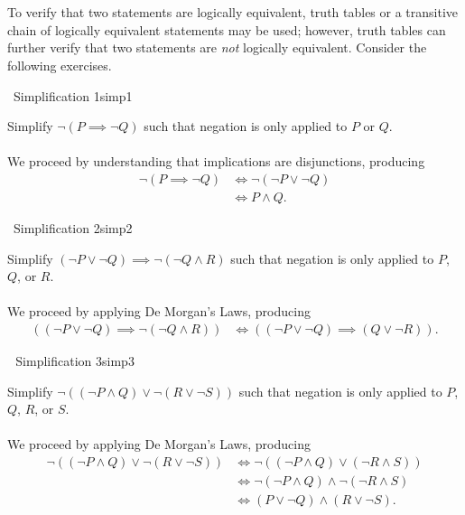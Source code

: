         \vphantom
        \\
        \\
        To verify that two statements are logically equivalent, truth tables or a transitive chain of logically equivalent statements may be used; however, truth tables can further verify that two statements are \textit{not} logically equivalent. Consider the following exercises.
        \begin{exercise}{\Difficulty\,\Difficulty\,\,Simplification 1}{simp1}
        
            Simplify \(\neg(P\implies\neg Q)\) such that negation is only applied to \(P\) or \(Q\).
            \\
            \\
            We proceed by understanding that implications are disjunctions, producing
            \begin{align*}
                \neg(P\implies\neg Q)&\iff\neg(\neg P \vee \neg Q) \\
                &\iff P\wedge Q.
            \end{align*}
        
        \end{exercise}
        \pagebreak
        \begin{exercise}{\Difficulty\,\Difficulty\,\,Simplification 2}{simp2}
        
            Simplify \((\neg P\vee\neg Q)\implies\neg(\neg Q\wedge R)\) such that negation is only applied to \(P\), \(Q\), or \(R\).
            \\
            \\
            We proceed by applying De Morgan's Laws, producing
            \begin{align*}
                ((\neg P\vee\neg Q)\implies\neg(\neg Q\wedge R))&\iff((\neg P\vee\neg Q)\implies(Q\vee \neg R)).
            \end{align*}
        
        \end{exercise}
        \begin{exercise}{\Difficulty\,\Difficulty\,\Difficulty\,\,Simplification 3}{simp3}
        
            Simplify \(\neg((\neg P \wedge Q)\vee \neg(R\vee \neg S))\) such that negation is only applied to \(P\), \(Q\), \(R\), or \(S\).
            \\
            \\
            We proceed by applying De Morgan's Laws, producing
            \begin{align*}
                \neg((\neg P \wedge Q)\vee \neg(R\vee \neg S))&\iff\neg((\neg P \wedge Q)\vee (\neg R\wedge S)) \\
                &\iff\neg(\neg P \wedge Q)\wedge \neg(\neg R\wedge S) \\
                &\iff(P \vee \neg Q)\wedge (R\vee \neg S).
            \end{align*}
        
        \end{exercise}
